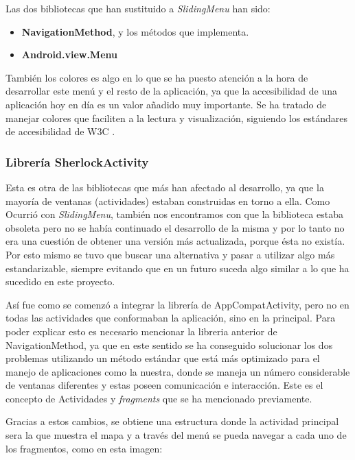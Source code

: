 Las dos bibliotecas que han sustituido a \textit{SlidingMenu} han sido:

\begin{itemize}
\item \textbf{NavigationMethod}, y los métodos que implementa.
\item \textbf{Android.view.Menu}
\end{itemize}

También los colores es algo en lo que se ha puesto atención a la hora de desarrollar este menú y el resto de la aplicación, ya que la accesibilidad de una aplicación hoy en día es un valor añadido muy importante. Se ha tratado de manejar colores que faciliten a la lectura y visualización, siguiendo los estándares de accesibilidad de W3C \cite{w3c}.

\subsubsection{Librería SherlockActivity}

Esta es otra de las bibliotecas que más han afectado al desarrollo, ya que la mayoría de ventanas (actividades) estaban construidas en torno a ella. Como Ocurrió con \textit{SlidingMenu}, también  nos encontramos con que la biblioteca estaba obsoleta pero no se había continuado el desarrollo de la misma y por lo tanto no era una cuestión de obtener una versión más actualizada, porque ésta no existía. Por esto mismo se tuvo que buscar una alternativa y pasar a utilizar algo más estandarizable, siempre evitando que en un futuro suceda algo similar a lo que ha sucedido en este proyecto.

Así fue como se comenzó a integrar la librería de AppCompatActivity, pero no en todas las actividades que conformaban la aplicación, sino en la principal. Para poder explicar esto es necesario mencionar la libreria anterior de NavigationMethod, ya que en este sentido se ha conseguido solucionar los dos problemas utilizando un método estándar que está más optimizado para el manejo de aplicaciones como la nuestra, donde se maneja un número considerable de ventanas diferentes y estas poseen comunicación e interacción. Este es el concepto de Actividades y \textit{fragments} que se ha mencionado previamente.

Gracias a estos cambios, se obtiene una estructura donde la actividad principal sera la que muestra el mapa y a través del menú se pueda navegar a cada uno de los fragmentos, como en esta imagen:


